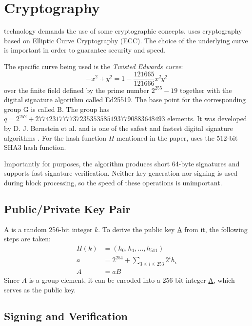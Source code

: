 \section{Cryptography}
\label{sec:cryptography}


 technology demands the use of some cryptographic concepts.
\codenamespace uses cryptography based on Elliptic Curve Cryptography (ECC).
The choice of the underlying curve is important in order to guarantee security and speed.

The specific curve being used is the \emph{Twisted Edwards curve}:
$$ -x^2 + y^2 = 1 - \frac{121665}{121666} x^2 y^2$$
over the finite field defined by the prime number $2^{255}-19$ together with the digital signature algorithm called Ed25519.
The base point for the corresponding group G is called B. The group has $q=2^{252} + 27742317777372353535851937790883648493$ elements.
It was developed by D. J. Bernstein et al. and is one of the safest and fastest digital signature algorithms \cite{Bernstein2011}.
For the hash function $H$ mentioned in the paper, \codenamespace uses the 512-bit SHA3 hash function.

Importantly for \codenamespace purposes, the algorithm produces short 64-byte signatures and supports fast signature verification.
Neither key generation nor signing is used during block processing, so the speed of these operations is unimportant.

\subsection{Public/Private Key Pair}

A  is a random 256-bit integer $k$. To derive the public key \underline{A} from it, the following steps are taken:
\begin{align}
H(k) &=(h_0, h_1,..., h_{511}) \\
a &= 2^{254} + \sum_{3\leq i \leq 253} 2^i h_i \\
A &= aB
\end{align}
Since $A$ is a group element, it can be encoded into a 256-bit integer \underline{A}, which serves as the public key.

\subsection{Signing and Verification}

